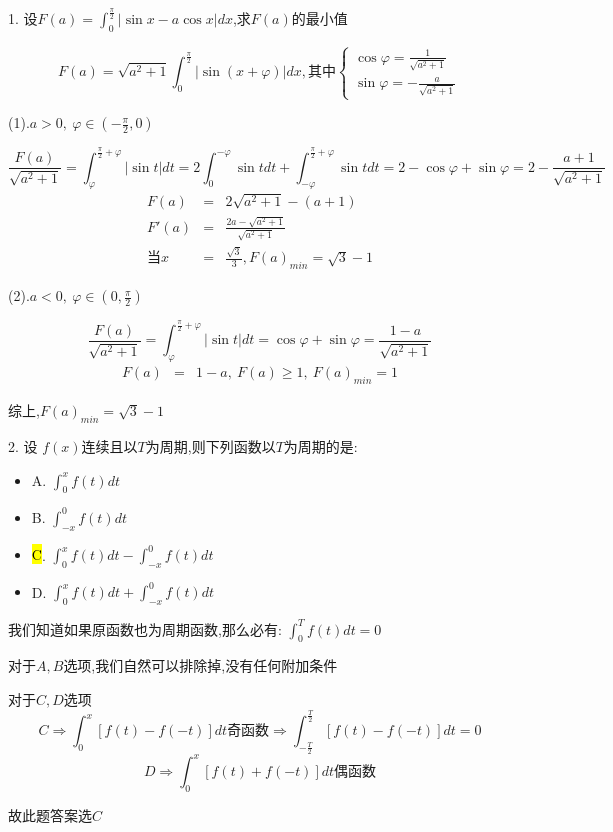 1. 设$F(a)=\int_{0}^{\frac{\pi}{2}}|\sin x-a\cos x|dx$,求$F(a)$的最小值
\begin{solution}
	
	$$F(a)=\sqrt{a^2+1}\int_{0}^{\frac{\pi}{2}}|\sin(x+\varphi)|dx,\text{其中}\left\lbrace 
	\begin{array}{l}
		\cos \varphi=\frac{1}{\sqrt{a^2+1}}\\
		\sin \varphi=-\frac{a}{\sqrt{a^2+1}}
	\end{array}
	\right. $$
	
	(1).$a>0,\ \varphi\in(-\frac{\pi}{2},0)$
	
	$$\frac{F(a)}{\sqrt{a^2+1}}=\int_{\varphi}^{\frac{\pi}{2}+\varphi}|\sin t|dt=2\int_{0}^{-\varphi}\sin tdt+\int_{-\varphi}^{\frac{\pi}{2}+\varphi}\sin tdt=2-\cos \varphi+\sin \varphi=2-\frac{a+1}{\sqrt{a^2+1}}$$
	\begin{eqnarray*}
		F(a)&=&2\sqrt{a^2+1}-(a+1)\\ F'(a)&=&\frac{2a-\sqrt{a^2+1}}{\sqrt{a^2+1}}\\
		\text{当}x&=&\frac{\sqrt{3}}{3},F(a)_{min}=\sqrt{3}-1
	\end{eqnarray*}
	
	(2).$a<0,\ \varphi\in(0,\frac{\pi}{2})$
	
	$$\frac{F(a)}{\sqrt{a^2+1}}=\int_{\varphi}^{\frac{\pi}{2}+\varphi}|\sin t|dt=\cos \varphi+\sin \varphi=\frac{1-a}{\sqrt{a^2+1}}$$
	\begin{eqnarray*}
		F(a)&=&1-a,\ F(a)\geq 1,\ F(a)_{min}=1
	\end{eqnarray*}
	
	综上,$F(a)_{min}=\sqrt{3}-1$
\end{solution}

2. 设 $f(x)$连续且以$T$为周期,则下列函数以$T$为周期的是: 
\begin{itemize}
	\item A. $\int_{0}^{x}f(t)dt$ 
	\item B. $\int_{-x}^{0}f(t)dt$ 
	\item \hl{C}. $\int_{0}^{x}f(t)dt-\int_{-x}^{0}f(t)dt$ 
	\item D. $\int_{0}^{x}f(t)dt+\int_{-x}^{0}f(t)dt$ 
\end{itemize}
\begin{solution}
	
	我们知道如果原函数也为周期函数,那么必有: $\int_{0}^{T}f(t)dt=0$
	
	对于$A,B$选项,我们自然可以排除掉,没有任何附加条件
	
	对于$C,D$选项
	$$C\Rightarrow \int_{0}^{x}[f(t)-f(-t)]dt\text{奇函数}\Rightarrow \int_{-\frac{T}{2}}^{\frac{T}{2}}[f(t)-f(-t)]dt=0$$
	$$D\Rightarrow \int_{0}^{x}[f(t)+f(-t)]dt\text{偶函数}$$
	
	故此题答案选$C$
\end{solution}

